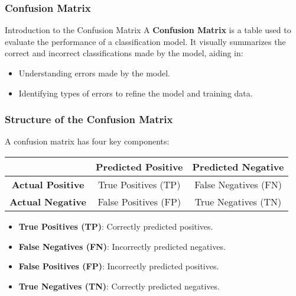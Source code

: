 \documentclass{beamer}
\begin{document}
\begin{frame}[fragile]
    \frametitle{Confusion Matrix}
    \begin{block}{Introduction to the Confusion Matrix}
        A \textbf{Confusion Matrix} is a table used to evaluate the performance of a classification model. It visually summarizes the correct and incorrect classifications made by the model, aiding in:
        \begin{itemize}
            \item Understanding errors made by the model.
            \item Identifying types of errors to refine the model and training data.
        \end{itemize}
    \end{block}
\end{frame}

\begin{frame}[fragile]
    \frametitle{Structure of the Confusion Matrix}
    A confusion matrix has four key components:

    \begin{table}[ht]
        \centering
        \begin{tabular}{|c|c|c|}
            \hline
            & \textbf{Predicted Positive} & \textbf{Predicted Negative} \\
            \hline
            \textbf{Actual Positive} & True Positives (TP) & False Negatives (FN) \\
            \hline
            \textbf{Actual Negative} & False Positives (FP) & True Negatives (TN) \\
            \hline
        \end{tabular}
    \end{table}
    
    \begin{itemize}
        \item \textbf{True Positives (TP)}: Correctly predicted positives.
        \item \textbf{False Negatives (FN)}: Incorrectly predicted negatives.
        \item \textbf{False Positives (FP)}: Incorrectly predicted positives.
        \item \textbf{True Negatives (TN)}: Correctly predicted negatives.
    \end{itemize}
\end{frame}
\end{document}
